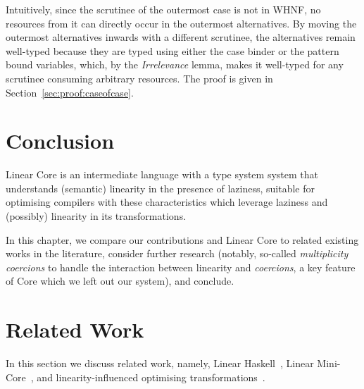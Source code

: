 \documentclass[acmsmall, screen, review]{acmart}
\begin{document}
Intuitively, since the scrutinee of the outermost case is not in WHNF, no
resources from it can directly occur in the outermost alternatives. By moving
the outermost alternatives inwards with a different scrutinee, the alternatives
remain well-typed because they are typed using either the case binder or the
pattern bound variables, which, by the \emph{Irrelevance} lemma, makes it
well-typed for any scrutinee consuming arbitrary resources. The proof is given in Section~\ref{sec:proof:caseofcase}.

\CaseOfCaseTheorem


\section{Conclusion\label{sec:discussion}}

Linear Core is an intermediate language with a type system system that
understands (semantic) linearity in the presence of laziness, suitable for
optimising compilers with these characteristics which leverage laziness and
(possibly) linearity in its transformations.

In this chapter, we compare our contributions and Linear Core to related
existing works in the literature,
%
consider further research
(notably, so-called \emph{multiplicity coercions} to handle the
interaction between linearity and \emph{coercions}, a key feature of Core which we
left out our system), and conclude.

\section{Related Work}

In this section we discuss related work, namely, Linear
Haskell~\cite{cite:linearhaskell}, Linear Mini-Core~\cite{cite:minicore}, and
linearity-influenced optimising
transformations~\cite{cite:let-floating,peytonjones1997a,cite:linearhaskell}.

\end{document}
